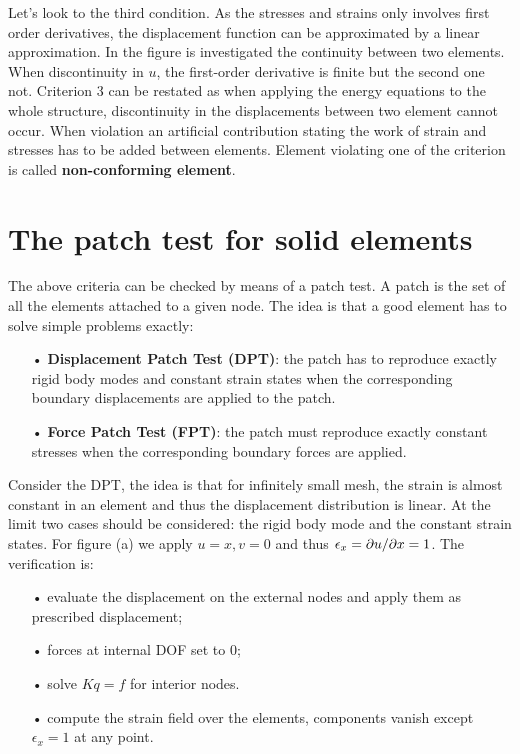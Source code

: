	Let's look to the third condition. As the stresses and strains only involves first order derivatives, the displacement function can be approximated by a linear approximation. In the figure is investigated the continuity between two elements. When discontinuity in $u$, the first-order derivative is finite but the second one not. Criterion 3 can be restated as when applying the energy equations to the whole structure, discontinuity in the displacements between two element cannot occur. When violation an artificial contribution stating the work of strain and stresses has to be added between elements. Element violating one of the criterion is called \textbf{non-conforming element}.
	
\section{The patch test for solid elements}
	The above criteria can be checked by means of a patch test. A patch is the set of all the elements attached to a given node. The idea is that a good element has to solve simple problems exactly: 
	
	\begin{itemize}
	\item[•] \textbf{Displacement Patch Test (DPT)}: the patch has to reproduce exactly rigid body modes and constant strain states when the corresponding boundary displacements are applied to the patch. \\
	\item[•] \textbf{Force Patch Test (FPT)}: the patch must reproduce exactly constant stresses when the corresponding boundary forces are applied. \\
	\end{itemize}	 
	
	Consider the DPT, the idea is that for infinitely small mesh, the strain is almost constant in an element and thus the displacement distribution is linear. At the limit two cases should be considered: the rigid body mode and the constant strain states. For figure (a) we apply $u=x, v=0$ and thus $\epsilon _x = \partial u/ \partial x = 1$. The verification is: 
	
	\begin{itemize}
	\item[•] evaluate the displacement on the external nodes and apply them as prescribed displacement;
	\item[•] forces at internal DOF set to 0; 
	\item[•] solve $Kq = f$ for interior nodes. 
	\item[•] compute the strain field over the elements, components vanish except $\epsilon _x = 1$ at any point. 
	\end{itemize}
	
